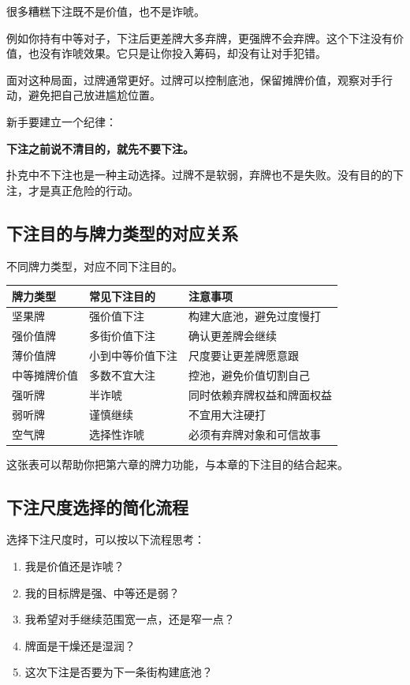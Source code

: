 很多糟糕下注既不是价值，也不是诈唬。

例如你持有中等对子，下注后更差牌大多弃牌，更强牌不会弃牌。这个下注没有价值，也没有诈唬效果。它只是让你投入筹码，却没有让对手犯错。

面对这种局面，过牌通常更好。过牌可以控制底池，保留摊牌价值，观察对手行动，避免把自己放进尴尬位置。

新手要建立一个纪律：

\begin{center}
\textbf{下注之前说不清目的，就先不要下注。}
\end{center}

扑克中不下注也是一种主动选择。过牌不是软弱，弃牌也不是失败。没有目的的下注，才是真正危险的行动。

\subsection{下注目的与牌力类型的对应关系}

不同牌力类型，对应不同下注目的。

\begin{center}
\begin{tabular}{lll}
\toprule
\textbf{牌力类型} & \textbf{常见下注目的} & \textbf{注意事项} \\
\midrule
坚果牌 & 强价值下注 & 构建大底池，避免过度慢打 \\
强价值牌 & 多街价值下注 & 确认更差牌会继续 \\
薄价值牌 & 小到中等价值下注 & 尺度要让更差牌愿意跟 \\
中等摊牌价值 & 多数不宜大注 & 控池，避免价值切割自己 \\
强听牌 & 半诈唬 & 同时依赖弃牌权益和牌面权益 \\
弱听牌 & 谨慎继续 & 不宜用大注硬打 \\
空气牌 & 选择性诈唬 & 必须有弃牌对象和可信故事 \\
\bottomrule
\end{tabular}
\end{center}

这张表可以帮助你把第六章的牌力功能，与本章的下注目的结合起来。

\subsection{下注尺度选择的简化流程}

选择下注尺度时，可以按以下流程思考：

\begin{enumerate}
\item 我是价值还是诈唬？
\item 我的目标牌是强、中等还是弱？
\item 我希望对手继续范围宽一点，还是窄一点？
\item 牌面是干燥还是湿润？
\item 这次下注是否要为下一条街构建底池？
\end{enumerate}

